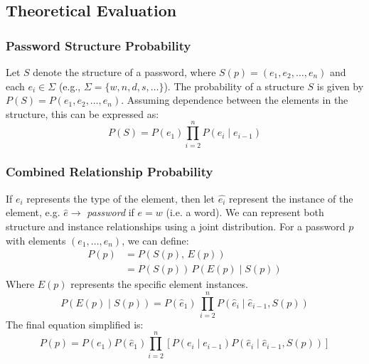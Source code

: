 \subsection{Theoretical Evaluation}
\vspace*{-0.1cm}
\subsubsection{Password Structure Probability}
   
   Let \( S \) denote the structure of a password, where \( S(p) = (e_1, e_2, \dots, e_n) \) and each \( e_i \in \Sigma \) (e.g., \( \Sigma = \{w, n, d, s, \dots\} \)). The probability of a structure \( S \) is given by $P(S) = P(e_1, e_2, \dots, e_n)$. Assuming dependence between the elements in the structure, this can be expressed as:
   \begin{equation}
   P(S) = P(e_1) \prod_{i=2}^{n} P(e_i \mid e_{i-1})
   \end{equation}

\subsubsection{Combined Relationship Probability}

If $e_i$ represents the type of the element, then let $\hat{e_i}$ represent the instance of the element, e.g. $\hat{e} \rightarrow$ \textit{password} if $e=w$ (i.e. a word). We can represent both structure and instance relationships using a joint distribution. For a password $p$ with elements $(e_1, ..., e_n)$, we can define:
\begin{align}
 P(p) &=P(S(p),\,E(p)) \\
      &= P(S(p)) \, P(E(p) \mid S(p))
 \label{eq::chp4::p(p)}
\end{align}
Where $E(p)$ represents the specific element instances.
\begin{equation}
P(E(p) \mid S(p)) = P(\hat{e}_1) \, \prod_{i=2}^n P(\hat{e}_i \mid \hat{e}_{i-1},S(p))
\end{equation}
The final equation simplified is:
   \begin{equation}
    P(p) = P(e_1) P(\hat{e}_1) \prod_{i=2}^{n} [P(e_i \mid e_{i-1}) P(\hat{e}_i \mid \hat{e}_{i-1},S(p))]
   \end{equation}

%


